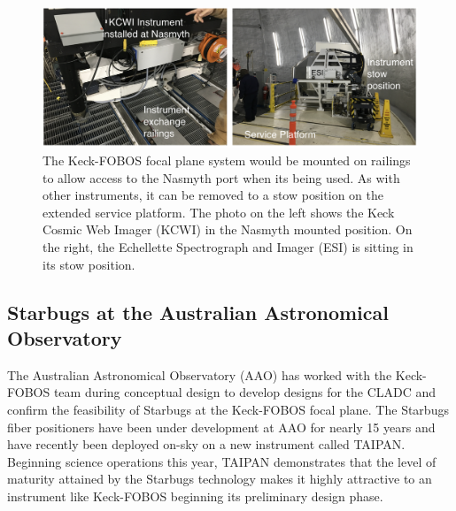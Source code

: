 \documentclass[oneside,11pt]{amsart}
\begin{document}
\begin{figure}[h!]
 \vskip -0.1in
 \includegraphics[width=\textwidth]{figs/Keck_instrument_exchange.png}
 \caption{\small The Keck-FOBOS focal plane system would be mounted on railings to allow access to the Nasmyth port when its being used.  As with other instruments, it can be removed to a stow position on the extended service platform.  The photo on the left shows the Keck Cosmic Web Imager (KCWI) in the Nasmyth mounted position.  On the right, the Echellette Spectrograph and Imager (ESI) is sitting in its stow position. }\label{fig:keck_exchange}
\end{figure}

\subsection{Starbugs at the Australian Astronomical Observatory} %
\label{sec:AAO}

The Australian Astronomical Observatory (AAO) has worked with the Keck-FOBOS team during conceptual design to develop
designs for the CLADC and confirm the feasibility of Starbugs at the Keck-FOBOS focal plane.  The Starbugs fiber
positioners have been under development at AAO for nearly 15 years \citep[see][]{staszak16} and have recently been
deployed on-sky on a new instrument called TAIPAN.  Beginning science operations this year, TAIPAN
demonstrates that the level of maturity attained by the Starbugs technology makes it highly attractive to an instrument
like Keck-FOBOS beginning its preliminary design phase.
\end{document}
